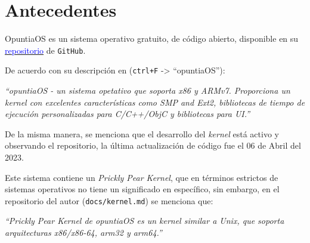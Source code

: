\section{Antecedentes}

OpuntiaOS es un sistema operativo gratuito, de código abierto, disponible
en su 
\href{https://github.com/opuntiaOS-Project/opuntiaOS}{\textcolor{blue}{repositorio}}
de \texttt{GitHub}.




De acuerdo con su descripción en \cite{osdev} (\texttt{ctrl+F} -> ``opuntiaOS''):
\begin{center}
	\begin{minipage}{10cm}
		\itshape
		``opuntiaOS - un sistema opetativo que soporta x86 y ARMv7. Proporciona un kernel con excelentes características como SMP and Ext2, bibliotecas de tiempo de ejecución personalizadas para C/C++/ObjC y bibliotecas para UI.''
	\end{minipage}
\end{center} 



De la misma manera, se menciona que el desarrollo del \textit{kernel} está activo
y observando el repositorio, la última actualización de código fue el 06 de Abril del 2023.



Este sistema contiene un \textit{Prickly Pear Kernel}, que en términos estrictos de sistemas operativos no tiene un significado en específico, sin embargo, en el repositorio del autor (\texttt{docs/kernel.md}) se menciona que:
\begin{center}
	\begin{minipage}{10cm}
		\itshape
		``Prickly Pear Kernel de opuntiaOS es un kernel similar a Unix, que soporta arquitecturas x86/x86-64, arm32 y arm64.''
	\end{minipage}
\end{center}



